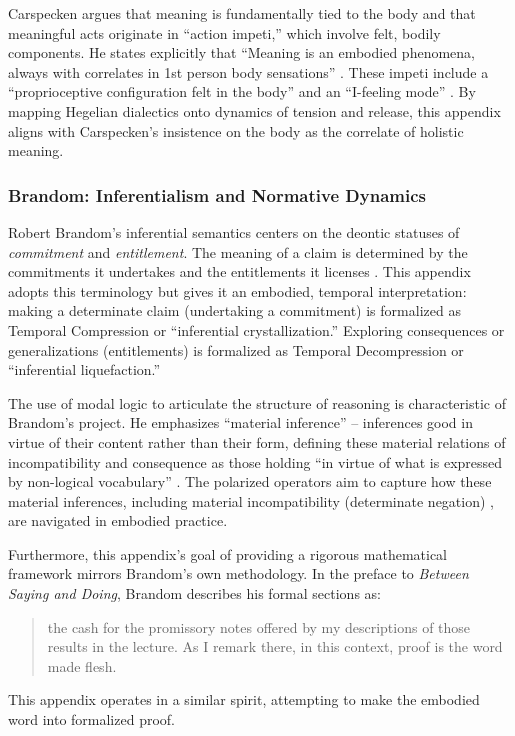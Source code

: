 \documentclass[12pt]{book}
\begin{document}
Carspecken argues that meaning is fundamentally tied to the body and that meaningful acts originate in ``action impeti,'' which involve felt, bodily components. He states explicitly that ``Meaning is an embodied phenomena, always with correlates in 1st person body sensations'' \parencite[p. 20]{Carspecken1995aa}. These impeti include a ``proprioceptive configuration felt in the body'' and an ``I-feeling mode'' \parencite[p. 20]{Carspecken1995aa}. By mapping Hegelian dialectics onto dynamics of tension and release, this appendix aligns with Carspecken's insistence on the body as the correlate of holistic meaning.

\subsubsection{Brandom: Inferentialism and Normative Dynamics}

Robert Brandom's inferential semantics centers on the deontic statuses of \textit{commitment} and \textit{entitlement}. The meaning of a claim is determined by the commitments it undertakes and the entitlements it licenses \parencite{brandom1994making, Brandom2000}. This appendix adopts this terminology but gives it an embodied, temporal interpretation: making a determinate claim (undertaking a commitment) is formalized as Temporal Compression or ``inferential crystallization.'' Exploring consequences or generalizations (entitlements) is formalized as Temporal Decompression or ``inferential liquefaction.''

The use of modal logic to articulate the structure of reasoning is characteristic of Brandom's project. He emphasizes ``material inference'' -- inferences good in virtue of their content rather than their form, defining these material relations of incompatibility and consequence as those holding ``in virtue of what is expressed by non-logical vocabulary'' \parencite[Note 9]{brandom_reason_2013}. The polarized operators aim to capture how these material inferences, including material incompatibility (determinate negation) \parencite{Brandom:2019aa}, are navigated in embodied practice.

Furthermore, this appendix's goal of providing a rigorous mathematical framework mirrors Brandom's own methodology. In the preface to \textit{Between Saying and Doing}, Brandom describes his formal sections as:
\begin{quote}
the cash for the promissory notes offered by my descriptions of those results in the lecture. As I remark there, in this context, proof is the word made flesh. \parencite[p. xix]{Brandom2008}
\end{quote}
This appendix operates in a similar spirit, attempting to make the embodied word into formalized proof.
\end{document}
